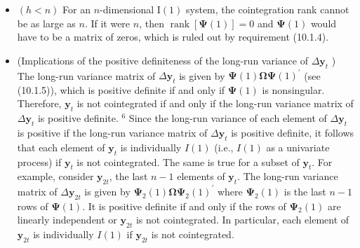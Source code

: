 \documentclass[10pt]{article}
\begin{document}
\begin{itemize}
  \item $(h<n)$ For an $n$-dimensional $\mathrm{I}(1)$ system, the cointegration rank cannot be as large as $n$. If it were $n$, then $\operatorname{rank}[\boldsymbol{\Psi}(1)]=0$ and $\boldsymbol{\Psi}(1)$ would have to be a matrix of zeros, which is ruled out by requirement (10.1.4).
  \item (Implications of the positive definiteness of the long-run variance of $\Delta \mathbf{y}_{t}$ ) The long-run variance matrix of $\Delta \mathbf{y}_{t}$ is given by $\boldsymbol{\Psi}(1) \boldsymbol{\Omega} \boldsymbol{\Psi}(1)^{\prime}$ (see (10.1.5)), which is positive definite if and only if $\boldsymbol{\Psi}(1)$ is nonsingular. Therefore, $\mathbf{y}_{t}$ is not cointegrated if and only if the long-run variance matrix of $\Delta \mathbf{y}_{t}$ is positive definite. ${ }^{6}$ Since the long-run variance of each element of $\Delta \mathbf{y}_{t}$ is positive if the long-run variance matrix of $\Delta \mathbf{y}_{t}$ is positive definite, it follows that each element of $\mathbf{y}_{t}$ is individually $I(1)$ (i.e., $I(1)$ as a univariate process) if $\mathbf{y}_{t}$ is not cointegrated. The same is true for a subset of $\mathbf{y}_{t}$. For example, consider $\mathbf{y}_{2 t}$, the last $n-1$ elements of $\mathbf{y}_{t}$. The long-run variance matrix of $\Delta \mathbf{y}_{2 t}$ is given by $\boldsymbol{\Psi}_{2}(1) \boldsymbol{\Omega} \boldsymbol{\Psi}_{2}(1)^{\prime}$ where $\boldsymbol{\Psi}_{2}(1)$ is the last $n-1$ rows of $\boldsymbol{\Psi}(1)$. It is positive definite if and only if the rows of $\boldsymbol{\Psi}_{2}(1)$ are linearly independent or $\mathbf{y}_{2 t}$ is not cointegrated. In particular, each element of $\mathbf{y}_{2 t}$ is individually $I(1)$ if $\mathbf{y}_{2 t}$ is not cointegrated.
\end{itemize}
\end{document}
